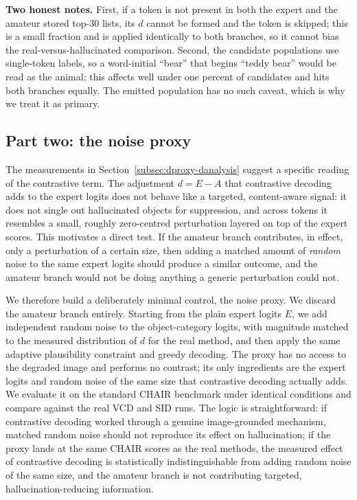 \textbf{Two honest notes.} First, if a token is not present in both the expert and
the amateur stored top-30 lists, its $d$ cannot be formed and the token is
skipped; this is a small fraction and is applied identically to both branches, so
it cannot bias the real-versus-hallucinated comparison. Second, the candidate
populations use single-token labels, so a word-initial ``bear'' that begins
``teddy bear'' would be read as the animal; this affects well under one percent
of candidates and hits both branches equally. The emitted population has no such
caveat, which is why we treat it as primary.

\subsection{Part two: the noise proxy}
\label{subsec:dproxy-proxy}

The measurements in Section~\ref{subsec:dproxy-danalysis} suggest a specific
reading of the contrastive term. The adjustment $d = E - A$ that contrastive
decoding adds to the expert logits does not behave like a targeted,
content-aware signal: it does not single out hallucinated objects for
suppression, and across tokens it resembles a small, roughly zero-centred
perturbation layered on top of the expert scores. This motivates a direct test.
If the amateur branch contributes, in effect, only a perturbation of a certain
size, then adding a matched amount of \emph{random} noise to the same expert
logits should produce a similar outcome, and the amateur branch would not be
doing anything a generic perturbation could not.

We therefore build a deliberately minimal control, the noise proxy. We discard
the amateur branch entirely. Starting from the plain expert logits $E$, we add
independent random noise to the object-category logits, with magnitude matched to
the measured distribution of $d$ for the real method, and then apply the same
adaptive plausibility constraint and greedy decoding. The proxy has no access to
the degraded image and performs no contrast; its only ingredients are the expert
logits and random noise of the same size that contrastive decoding actually adds.
We evaluate it on the standard CHAIR benchmark under identical conditions and
compare against the real VCD and SID runs. The logic is straightforward: if
contrastive decoding worked through a genuine image-grounded mechanism, matched
random noise should not reproduce its effect on hallucination; if the proxy lands
at the same CHAIR scores as the real methods, the measured effect of contrastive
decoding is statistically indistinguishable from adding random noise of the same
size, and the amateur branch is not contributing targeted, hallucination-reducing
information.

